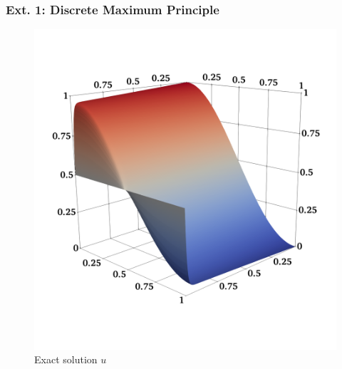 \documentclass[aspectratio=169,xcolor=dvipsnames,11pt]{beamer}
\begin{document}
\begin{frame}\frametitle{Ext. 1: Discrete Maximum Principle}
\begin{figure}
	\centering
	\begin{minipage}{0.3\textwidth}
	\small
		\centering
		\includegraphics[width=\linewidth]{Figures/advection_diffusion_u_exact.png}
		\\
		Exact solution $u$
	\end{minipage}%
	\
	\begin{minipage}{0.03\textwidth}
	\small
		\centering

\end{minipage}
\end{figure}
\end{frame}
\end{document}
